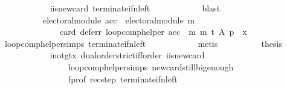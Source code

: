 \begin{isabellebody}
\ \ \ \ \ \ \ \ \ \ \isamarkupfalse%
\ i{\isacharunderscore}{\kern0pt}is{\isacharunderscore}{\kern0pt}new{\isacharunderscore}{\kern0pt}card\ terminate{\isacharunderscore}{\kern0pt}if{\isacharunderscore}{\kern0pt}n{\isacharunderscore}{\kern0pt}left\isanewline
\ \ \ \ \ \ \ \ \ \ \isamarkupfalse%
\ blast\isanewline
\ \ \ \ \ \ \ \ \isamarkupfalse%
\isanewline
\ \ \ \ \ \ \ \ \ \ {\isachardoublequoteopen}electoral{\isacharunderscore}{\kern0pt}module\ acc\ {\isasymand}\ electoral{\isacharunderscore}{\kern0pt}module\ m\ {\isasymlongrightarrow}\isanewline
\ \ \ \ \ \ \ \ \ \ \ \ \ \ card\ {\isacharparenleft}{\kern0pt}defer{\isacharunderscore}{\kern0pt}r\ {\isacharparenleft}{\kern0pt}loop{\isacharunderscore}{\kern0pt}comp{\isacharunderscore}{\kern0pt}helper\ {\isacharparenleft}{\kern0pt}acc\ {\isasymtriangleright}\ m{\isacharparenright}{\kern0pt}\ m\ t\ A\ p{\isacharparenright}{\kern0pt}{\isacharparenright}{\kern0pt}\ {\isacharequal}{\kern0pt}\ x{\isachardoublequoteclose}\isanewline
\ \ \ \ \ \ \ \ \ \ \isamarkupfalse%
\ loop{\isacharunderscore}{\kern0pt}comp{\isacharunderscore}{\kern0pt}helper{\isachardot}{\kern0pt}simps{\isacharparenleft}{\kern0pt}{}{\isacharparenright}{\kern0pt}\ terminate{\isacharunderscore}{\kern0pt}if{\isacharunderscore}{\kern0pt}n{\isacharunderscore}{\kern0pt}left\isanewline
\ \ \ \ \ \ \ \ \ \ \isamarkupfalse%
\ metis\isanewline
\ \ \ \ \ \ \ \ \isamarkupfalse%
\ {\isacharquery}{\kern0pt}thesis\isanewline
\ \ \ \ \ \ \ \ \ \ \isamarkupfalse%
\ i{\isacharunderscore}{\kern0pt}not{\isacharunderscore}{\kern0pt}gt{\isacharunderscore}{\kern0pt}x\ dual{\isacharunderscore}{\kern0pt}order{\isachardot}{\kern0pt}strict{\isacharunderscore}{\kern0pt}iff{\isacharunderscore}{\kern0pt}order\ i{\isacharunderscore}{\kern0pt}is{\isacharunderscore}{\kern0pt}new{\isacharunderscore}{\kern0pt}card\isanewline
\ \ \ \ \ \ \ \ \ \ \ \ \ \ \ \ loop{\isacharunderscore}{\kern0pt}comp{\isacharunderscore}{\kern0pt}helper{\isachardot}{\kern0pt}simps{\isacharparenleft}{\kern0pt}{}{\isacharparenright}{\kern0pt}\ new{\isacharunderscore}{\kern0pt}card{\isacharunderscore}{\kern0pt}still{\isacharunderscore}{\kern0pt}big{\isacharunderscore}{\kern0pt}enough\isanewline
\ \ \ \ \ \ \ \ \ \ \ \ \ \ \ \ f{\isacharunderscore}{\kern0pt}prof\ rec{\isacharunderscore}{\kern0pt}step\ terminate{\isacharunderscore}{\kern0pt}if{\isacharunderscore}{\kern0pt}n{\isacharunderscore}{\kern0pt}left\isanewline
\ \ \ \ \ \ \ \ \ \ \isamarkupfalse%

\end{isabellebody}
